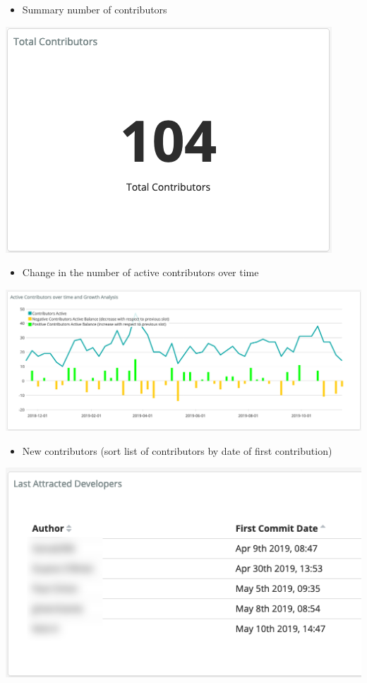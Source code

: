 \begin{itemize}
\tightlist
\item
  Summary number of contributors
\end{itemize}

\includegraphics{images/contributors_summary-contributor-number.png}

\begin{itemize}
\tightlist
\item
  Change in the number of active contributors over time
\end{itemize}

\includegraphics{images/contributors_growth.png}

\begin{itemize}
\tightlist
\item
  New contributors (sort list of contributors by date of first
  contribution)
\end{itemize}

\includegraphics{images/contributors_first-commit-date.png}

